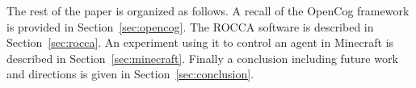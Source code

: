 \documentclass[runningheads]{llncs}
\begin{document}




The rest of the paper is organized as follows.  A recall of the
OpenCog framework is provided in Section~\ref{sec:opencog}.  The ROCCA
software is described in Section~\ref{sec:rocca}.  An experiment using
it to control an agent in Minecraft is described in
Section~\ref{sec:minecraft}.  Finally a conclusion including future
work and directions is given in Section~\ref{sec:conclusion}.

\end{document}
